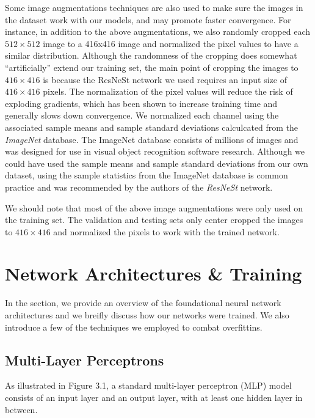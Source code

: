 \documentclass [MAS] {uclathes}
\begin{document}
Some image augmentations techniques are also used to make sure the images in the dataset work with our models, and may promote faster convergence. For instance, in addition to the above augmentations, we also randomly cropped each $512 \times 512$ image to a 416x416 image and normalized the pixel values to have a similar distribution. Although the randomness of the cropping does somewhat ``artificially'' extend our training set, the main point of cropping the images to $416 \times 416$ is because the ResNeSt network we used requires an input size of $416 \times 416$ pixels. The normalization of the pixel values will reduce the risk of exploding gradients, which has been shown to increase training time and generally slows down convergence. We normalized each channel using the associated sample means and sample standard deviations calculcated from the \textit{ImageNet} database. The ImageNet database consists of millions of images and was designed for use in visual object recognition software research. Although we could have used the sample means and sample standard deviations from our own dataset, using the sample statistics from the ImageNet database is common practice and was recommended by the authors of the \textit{ResNeSt} network.

We should note that most of the above image augmentations were only used on the training set. The validation and testing sets only center cropped the images to $416 \times 416$ and normalized the pixels to work with the trained network.

\section{Network Architectures \& Training}

In the section, we provide an overview of the foundational neural network architectures and we breifly discuss how our networks were trained. We also introduce a few of the techniques we employed to combat overfittins.

\subsection{Multi-Layer Perceptrons}

As illustrated in Figure 3.1, a standard multi-layer perceptron (MLP) model consists of an input layer and an output layer, with at least one hidden layer in between. 
\end{document}
